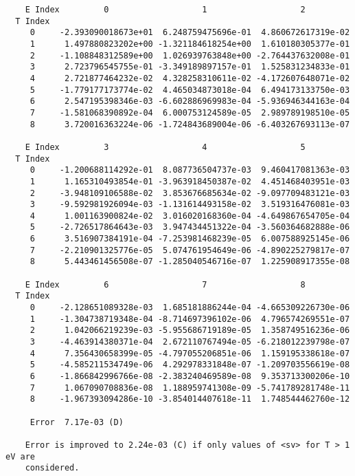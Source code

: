 \documentclass[12pt,dvipdfmx]{article}
\begin{document}
\begin{small}\begin{verbatim}
    E Index         0                   1                   2
  T Index
     0     -2.393090018673e+01  6.248759475696e-01  4.860672617319e-02
     1      1.497880823202e+00 -1.321184618254e+00  1.610180305377e-01
     2     -1.108848312589e+00  1.026939763848e+00 -2.764437632008e-01
     3      2.723796545755e-01 -3.349189897157e-01  1.525831234833e-01
     4      2.721877464232e-02  4.328258310611e-02 -4.172607648071e-02
     5     -1.779177173774e-02  4.465034873018e-04  6.494173133750e-03
     6      2.547195398346e-03 -6.602886969983e-04 -5.936946344163e-04
     7     -1.581068390892e-04  6.000753124589e-05  2.989789198510e-05
     8      3.720016363224e-06 -1.724843689004e-06 -6.403267693113e-07

    E Index         3                   4                   5
  T Index
     0     -1.200688114292e-01  8.087736504737e-03  9.460417081363e-03
     1      1.165310493854e-01 -3.963918450387e-02  4.451468403951e-03
     2     -3.948109106588e-02  3.853676685634e-02 -9.097709483121e-03
     3     -9.592981926094e-03 -1.131614493158e-02  3.519316476081e-03
     4      1.001163900824e-02  3.016020168360e-04 -4.649867654705e-04
     5     -2.726517864643e-03  3.947434451322e-04 -3.560364682888e-06
     6      3.516907384191e-04 -7.253981468239e-05  6.007588925145e-06
     7     -2.210901325776e-05  5.074761954649e-06 -4.890225279817e-07
     8      5.443461456508e-07 -1.285040546716e-07  1.225908917355e-08

    E Index         6                   7                   8
  T Index
     0     -2.128651089328e-03  1.685181886244e-04 -4.665309226730e-06
     1     -1.304738719348e-04 -8.714697396102e-06  4.796574269551e-07
     2      1.042066219239e-03 -5.955686719189e-05  1.358749516236e-06
     3     -4.463914380371e-04  2.672110767494e-05 -6.218012239798e-07
     4      7.356430658399e-05 -4.797055206851e-06  1.159195338618e-07
     5     -4.585211534749e-06  4.292978331848e-07 -1.209703556619e-08
     6     -1.866842996766e-08 -2.383240469589e-08  9.353713300206e-10
     7      1.067090708836e-08  1.188959741308e-09 -5.741789281748e-11
     8     -1.967393094286e-10 -3.854014407618e-11  1.748544462760e-12

     Error  7.17e-03 (D)

    Error is improved to 2.24e-03 (C) if only values of <sv> for T > 1 eV are
    considered.
\end{verbatim}\end{small}
\newpage
\end{document}
